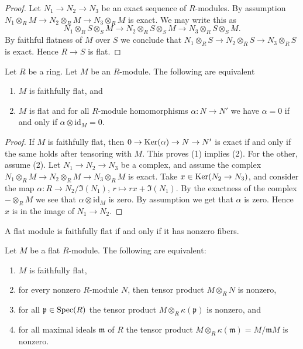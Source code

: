 \begin{proof}
	Let $N_1 \to N_2 \to N_3$ be an exact sequence of $R$-modules.
	By assumption $N_1 \otimes_R M \to N_2 \otimes_R M \to N_3 \otimes_R M$
	is exact. We may write this as
	$$
	N_1 \otimes_R S \otimes_S M
	\to
	N_2 \otimes_R S \otimes_S M
	\to
	N_3 \otimes_R S \otimes_S M.
	$$
	By faithful flatness of $M$ over $S$ we conclude that
	$N_1 \otimes_R S \to N_2 \otimes_R S \to N_3 \otimes_R S$ is exact.
	Hence $R \to S$ is flat.
\end{proof}

\begin{lemma}\cite[\href{https://stacks.math.columbia.edu/tag/00HO}{Lemma 00HO}]{stacks-project}
	\label{lemma-easy-ff}
	Let $R$ be a ring.
	Let $M$ be an $R$-module.
	The following are equivalent
	\begin{enumerate}
		\item $M$ is faithfully flat, and
		\item $M$ is flat and for all $R$-module homomorphisms $\alpha : N \to N'$
		we have $\alpha = 0$ if and only if $\alpha \otimes \text{id}_M = 0$.
	\end{enumerate}
\end{lemma}

\begin{proof}
	If $M$ is faithfully flat, then
	$0 \to \mathop{\mathrm{Ker}}(\alpha) \to N \to N'$ is exact if and only if the same holds
	after tensoring with $M$. This proves (1) implies (2).
	For the other, assume (2). Let $N_1 \to N_2 \to N_3$
	be a complex, and assume the complex
	$N_1 \otimes_R M \to N_2 \otimes_R M \to N_3\otimes_R M$
	is exact. Take $x \in \mathop{\mathrm{Ker}}(N_2 \to N_3)$,
	and consider the map $\alpha : R \to N_2/\Im(N_1)$,
	$r \mapsto rx + \Im(N_1)$. By the exactness
	of the complex $-\otimes_R M$ we see that $\alpha \otimes
	\text{id}_M$ is zero. By assumption we get that $\alpha$ is
	zero. Hence $x $ is in the image of $N_1 \to N_2$.
\end{proof}

\begin{lemma}\cite[\href{https://stacks.math.columbia.edu/tag/00HP}{Lemma 00HP}]{stacks-project}
	\label{lemma-ff}
	\begin{slogan}
		A flat module is faithfully flat if and only if it has nonzero fibers.
	\end{slogan}
	Let $M$ be a flat $R$-module.
	The following are equivalent:
	\begin{enumerate}
		\item $M$ is faithfully flat,
		\item for every nonzero $R$-module $N$, then tensor product $M \otimes_R N$
		is nonzero,
		\item for all $\mathfrak p \in \mathop{\mathrm{Spec}}(R)$
		the tensor product $M \otimes_R \kappa(\mathfrak p)$ is nonzero, and
		\item for all maximal ideals $\mathfrak m$ of $R$
		the tensor product $M \otimes_R \kappa(\mathfrak m) = M/{\mathfrak m}M$
		is nonzero.
	\end{enumerate}
\end{lemma}

